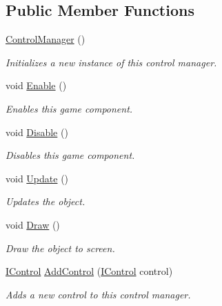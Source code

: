 \subsection*{Public Member Functions}
\begin{DoxyCompactItemize}
\item 
\hyperlink{class_tri_devs_1_1_tri_engine_1_1_u_i_1_1_control_manager_aaf52ddcc196fbbb0a856085e0d968508}{Control\-Manager} ()
\begin{DoxyCompactList}\small\item\em Initializes a new instance of this control manager. \end{DoxyCompactList}\item 
void \hyperlink{class_tri_devs_1_1_tri_engine_1_1_u_i_1_1_control_manager_a78f9869b85195889aa8629578bee0542}{Enable} ()
\begin{DoxyCompactList}\small\item\em Enables this game component. \end{DoxyCompactList}\item 
void \hyperlink{class_tri_devs_1_1_tri_engine_1_1_u_i_1_1_control_manager_a746de852afd57fa3da574a0e8697cbc0}{Disable} ()
\begin{DoxyCompactList}\small\item\em Disables this game component. \end{DoxyCompactList}\item 
void \hyperlink{class_tri_devs_1_1_tri_engine_1_1_u_i_1_1_control_manager_a75a509f8757e2abc4e77e01984dae100}{Update} ()
\begin{DoxyCompactList}\small\item\em Updates the object. \end{DoxyCompactList}\item 
void \hyperlink{class_tri_devs_1_1_tri_engine_1_1_u_i_1_1_control_manager_a34aa09aebabac8281866c783726213dd}{Draw} ()
\begin{DoxyCompactList}\small\item\em Draw the object to screen. \end{DoxyCompactList}\item 
\hyperlink{interface_tri_devs_1_1_tri_engine_1_1_u_i_1_1_i_control}{I\-Control} \hyperlink{class_tri_devs_1_1_tri_engine_1_1_u_i_1_1_control_manager_ab96970bf405a0445c1e17cdbbc1e48a7}{Add\-Control} (\hyperlink{interface_tri_devs_1_1_tri_engine_1_1_u_i_1_1_i_control}{I\-Control} control)
\begin{DoxyCompactList}\small\item\em Adds a new control to this control manager. \end{DoxyCompactList}\item 

\end{DoxyCompactItemize}
